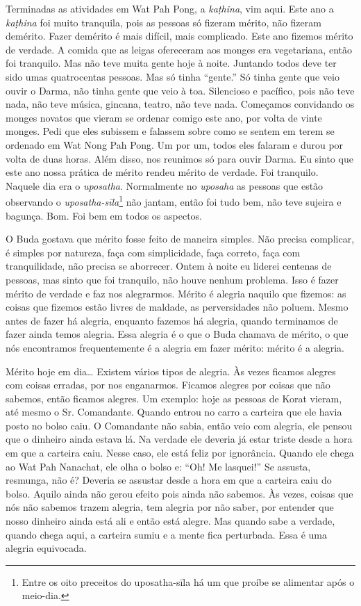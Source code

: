 Terminadas as atividades em Wat Pah Pong, a \textit{kaṭhina}, vim
aqui. Este ano a \textit{kaṭhina} foi muito tranquila, pois as pessoas
só fizeram mérito, não fizeram demérito. Fazer demérito é mais difícil,
mais complicado. Este ano fizemos mérito de verdade. A comida que as
leigas ofereceram aos monges era vegetariana, então foi tranquilo. Mas
não teve muita gente hoje à noite. Juntando todos deve ter sido umas
quatrocentas pessoas. Mas só tinha “gente.” Só tinha gente que veio
ouvir o Darma, não tinha gente que veio à toa. Silencioso e pacífico,
pois não teve nada, não teve música, gincana, teatro, não teve nada.
Começamos convidando os monges novatos que vieram se ordenar comigo
este ano, por volta de vinte monges. Pedi que eles subissem e falassem
sobre como se sentem em terem se ordenado em Wat Nong Pah Pong. Um por
um, todos eles falaram e durou por volta de duas horas. Além disso, nos
reunimos só para ouvir Darma. Eu sinto que este ano nossa prática de
mérito rendeu mérito de verdade. Foi tranquilo. Naquele dia era o
\textit{uposatha}. Normalmente no \textit{uposaha} as pessoas que estão
observando o \textit{uposatha-sīla}\footnote{Entre os oito preceitos
do uposatha-sīla há um que proíbe se alimentar após o meio-dia.} não
jantam, então foi tudo bem, não teve sujeira e bagunça. Bom. Foi bem em
todos os aspectos. 

O Buda gostava que mérito fosse feito de maneira simples. Não
precisa complicar, é simples por natureza, faça com simplicidade, faça
correto, faça com tranquilidade, não precisa se aborrecer. Ontem à
noite eu liderei centenas de pessoas, mas sinto que foi tranquilo, não
houve nenhum problema. Isso é fazer mérito de verdade e faz nos
alegrarmos. Mérito é alegria naquilo que fizemos: as coisas que fizemos
estão livres de maldade, as perversidades não poluem. Mesmo antes de
fazer há alegria, enquanto fazemos há alegria, quando terminamos de
fazer ainda temos alegria. Essa alegria é o que o Buda chamava de
mérito, o que nós encontramos frequentemente é a alegria em fazer
mérito: mérito é a alegria. 

Mérito hoje em dia\ldots{} Existem vários tipos de alegria. Às vezes
ficamos alegres com coisas erradas, por nos enganarmos. Ficamos alegres
por coisas que não sabemos, então ficamos alegres. Um exemplo: hoje as
pessoas de Korat vieram, até mesmo o Sr. Comandante. Quando entrou no
carro a carteira que ele havia posto no bolso caiu. O Comandante não
sabia, então veio com alegria, ele pensou que o dinheiro ainda estava
lá. Na verdade ele deveria já estar triste desde a hora em que a
carteira caiu. Nesse caso, ele está feliz por ignorância. Quando ele
chega ao Wat Pah Nanachat, ele olha o bolso e: “Oh! Me lasquei!” Se
assusta, resmunga, não é? Deveria se assustar desde a hora em que a
carteira caiu do bolso. Aquilo ainda não gerou efeito pois ainda não
sabemos. Às vezes, coisas que nós não sabemos trazem alegria, tem
alegria por não saber, por entender que nosso dinheiro ainda está ali e
então está alegre. Mas quando sabe a verdade, quando chega aqui, a
carteira sumiu e a mente fica perturbada. Essa é uma alegria
equivocada. 


